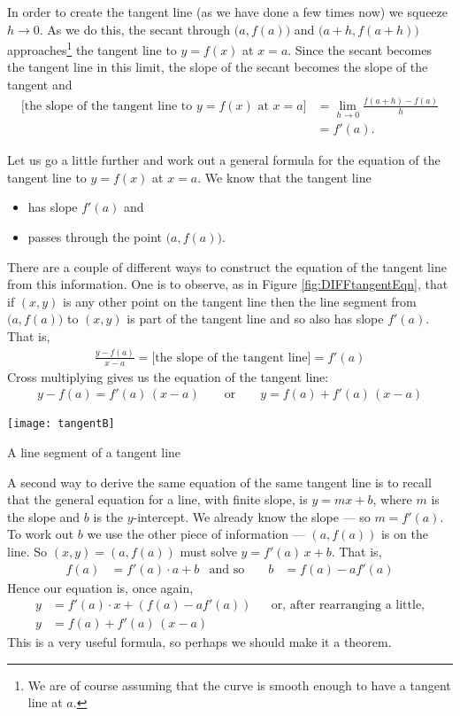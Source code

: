 In order to create the tangent line (as we have done a few times now) we
squeeze $h \to 0$. As we do this, the secant through $\big(a,f(a)\big)$
and $\big(a+h,f(a+h)\big)$ approaches\footnote{We are of course
   assuming that the curve is smooth enough to have a tangent line at $a$.}
the tangent line to $y=f(x)$ at $x=a$. Since the secant becomes the
tangent line in this limit, the slope of the secant becomes the slope
of the tangent and
\begin{align*}
\big[\text{the slope of the tangent line to $y=f(x)$ at $x=a$}\big]
&=\lim_{h\rightarrow 0}\frac{f(a+h)-f(a)}{h} \\
&=f'(a).
\end{align*}


Let us go a little further and work out a general formula for the equation
of the tangent line to $y=f(x)$ at $x=a$. We know that the tangent line
\begin{itemize}
\item
   has slope $f'(a)$ and
\item
   passes through the point $\big(a, f(a)\big)$.
\end{itemize}

\noindent
There are a couple of different ways to construct the equation of the tangent
line from this information. One is to observe, as in
Figure \ref{fig:DIFFtangentEqn}, that if $(x,y)$ is any
other point on the tangent line then the line segment from $\big(a,f(a)\big)$
to $(x,y)$ is part of the tangent line and so also has slope $f'(a)$.
That is,
\begin{align*}
\frac{y- f(a)}{x-a} =\big[\text{the slope of the tangent line}\big]
  =f'(a)
\end{align*}
Cross multiplying gives us the equation of the tangent line:
\begin{align*}
y-f(a) = f'(a)\,(x-a)\qquad\text{or}\qquad
y=f(a)+f'(a)\,(x-a)
\end{align*}
\begin{fig}
\label{fig:DIFFtangentEqn}
  \begin{center}
  \texttt{[image: tangentB]}

  A line segment of a tangent line
  \end{center}
\end{fig}


A second way to derive the same equation of the same tangent line is
to recall that the general equation for a line, with finite  slope,
is $y=mx+b$, where $m$ is the slope and $b$ is the $y$-intercept.
We already know the slope --- so $m=f'(a)$. To work out $b$ we use
the other piece of information --- $(a,f(a))$ is on the line.
So $(x,y)=(a,f(a))$ must solve $y=f'(a)\,x+b$. That is,
\begin{align*}
  f(a) &= f'(a) \cdot a + b & \text{and so } &&  b&=f(a)- af'(a)
\end{align*}
Hence our equation is, once again,
\begin{align*}
  y &= f'(a) \cdot x + \left(f(a)-af'(a) \right)
            && \text{or, after rearranging a little,} \\
  y &= f(a) + f'(a) \, (x-a)
\end{align*}
This is a very useful formula, so perhaps we should make it a theorem.


